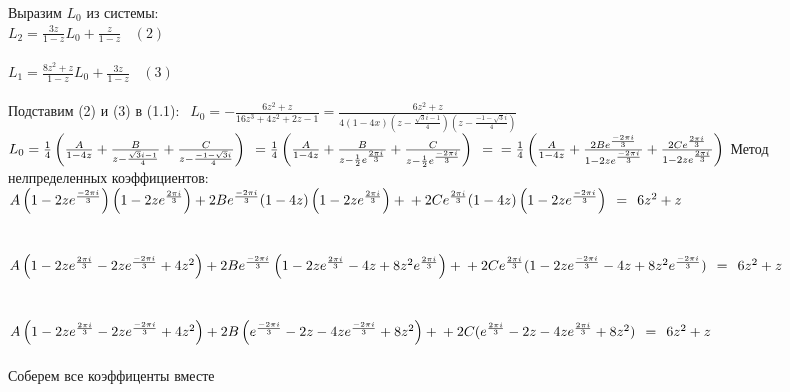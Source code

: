 \documentclass[a4paper,12pt]{article} %
\begin{document}
			Выразим $L_0$ из системы:\\
			$L_2=\frac{3z}{1-z}L_0+\frac{z}{1-z} \: \: \: \: (2)$\\ \\
			$L_1=\frac{8z^2+z}{1-z}L_0+\frac{3z}{1-z} \: \: \: \: (3) $
			\\ \\
			Подставим (2) и (3) в (1.1):
			$ \: \: L_0=-\frac{6z^2+z}{16z^3+4z^2+2z-1}=\frac{6z^2+z}{4(1-4x)(z-\frac{\sqrt{3}i-1}{4})(z-\frac{-1-\sqrt{3}i}{4})} $\\
			$ L_0=\frac{1}{4}\left(
			\frac{A}{1-4z}+\frac{B}{z-\frac{\sqrt{3}i-1}{4}}+\frac{C}{z-\frac{-1-\sqrt{3}i}{4}}
			\right)\:\:= \frac{1}{4}\left(
			\frac{A}{1-4z}+\frac{B}{z-\frac{1}{2}e^{\frac{2\pi i}{3}}}+\frac{C}{z-\frac{1}{2}e^{\frac{-2\pi i}{3}}}
			\right)
			\:\:=\\ \\= \frac{1}{4}\left(
			\frac{A}{1-4z}+\frac{2Be^{\frac{-2\pi i}{3}}}{1-2ze^{\frac{-2\pi i}{3}}}+\frac{2Ce^{\frac{2\pi i}{3}}}{1-2ze^{\frac{2\pi i}{3}}}
			\right) $
			\newpage
			Метод нелпределенных коэффициентов:\\
			$ A\left(
			1-2ze^{\frac{-2\pi i}{3}}
			\right)
			\left(
			1-2ze^{\frac{2\pi i}{3}}
			\right)+2Be^{\frac{-2\pi i}{3}}(1-4z)\left(
			1-2ze^{\frac{2\pi i}{3}}
			\right)+\\ \\+2Ce^{\frac{2\pi i}{3}}(1-4z)\left(
			1-2ze^{\frac{-2\pi i}{3}}
			\right) \:\:=\:\: 6z^2+z $\\ \\ \\
			$ A\left(
			1-2ze^{\frac{2\pi i}{3}}-2ze^{\frac{-2\pi i}{3}}+4z^2
			\right)
			+2Be^{\frac{-2\pi i}{3}}\left(1-2ze^{\frac{2\pi i}{3}}-4z+8z^2e^{\frac{2 \pi i}{3}}\right)+\\+2Ce^{\frac{2\pi i}{3}}(1-2ze^{\frac{-2\pi i}{3}}-4z+8z^2e^{\frac{-2 \pi i}{3}}) \:\:=\:\: 6z^2+z $
			\\ \\ \\
			$ A\left(
			1-2ze^{\frac{2\pi i}{3}}-2ze^{\frac{-2\pi i}{3}}+4z^2
			\right)
			+2B\left(e^{\frac{-2\pi i}{3}}-2z-4ze^{\frac{-2 \pi i}{3}}+8z^2\right)+\\ \\+2C(e^{\frac{2\pi i}{3}}-2z-4ze^{\frac{2\pi i}{3}}+8z^2) \:\:=\:\: 6z^2+z $\\ \\
			Соберем все коэффиценты вместе \\ \\
\end{document}
